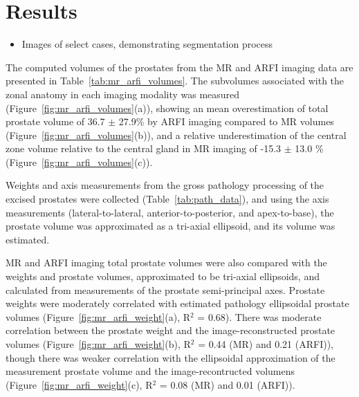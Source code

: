 \section{Results}\label{sect:results}

\begin{itemize}
    \item Images of select cases, demonstrating segmentation process
\end{itemize}

The computed volumes of the prostates from the MR and ARFI imaging data are
presented in Table~\ref{tab:mr_arfi_volumes}.  The subvolumes associated
with the zonal anatomy in each imaging modality was measured
(Figure~\ref{fig:mr_arfi_volumes}(a)), showing an mean overestimation of
total prostate volume of 36.7 $\pm$ 27.9\% by ARFI imaging compared to MR
volumes (Figure~\ref{fig:mr_arfi_volumes}(b)), and a relative
underestimation of the central zone volume relative to the central gland in MR
imaging of -15.3 $\pm$ 13.0 \% (Figure~\ref{fig:mr_arfi_volumes}(c)).





Weights and axis measurements from the gross pathology processing of the
excised prostates were collected (Table~\ref{tab:path_data}), and using the
axis measurements (lateral-to-lateral, anterior-to-posterior, and
apex-to-base), the prostate volume was approximated as a tri-axial ellipsoid,
and its volume was estimated.



MR and ARFI imaging total prostate volumes were also compared with the weights
and prostate volumes, approximated to be tri-axial ellipsoids, and calculated
from measurements of the prostate semi-principal axes.  Prostate weights were
moderately correlated with estimated pathology ellipsoidal prostate volumes
(Figure~\ref{fig:mr_arfi_weight}(a), R$^2$ = 0.68).  There was moderate
correlation between the prostate weight and the image-reconstructed prostate
volumes (Figure~\ref{fig:mr_arfi_weight}(b), R$^2$ = 0.44 (MR) and 0.21
(ARFI)), though there was weaker correlation with the ellipsoidal approximation
of the measurement prostate volume and the image-recontructed volumens
(Figure~\ref{fig:mr_arfi_weight}(c), R$^2$ = 0.08 (MR) and 0.01 (ARFI)).  




